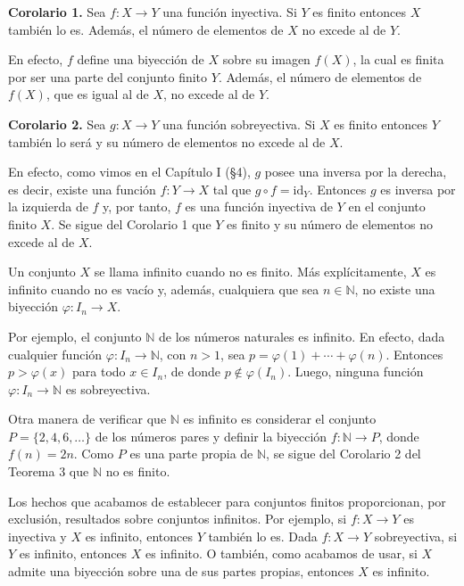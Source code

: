 \documentclass[12pt,oneside]{book}
\begin{document}
\textbf{Corolario 1.} Sea \( f: X \to Y \) una función inyectiva. Si \( Y \) es finito entonces \( X \) también lo es. Además, el número de elementos de \( X \) no excede al de \( Y \).

En efecto, \( f \) define una biyección de \( X \) sobre su imagen \( f(X) \), la cual es finita por ser una parte del conjunto finito \( Y \). Además, el número de elementos de \( f(X) \), que es igual al de \( X \), no excede al de \( Y \).

\textbf{Corolario 2.} Sea \( g: X \to Y \) una función sobreyectiva. Si \( X \) es finito entonces \( Y \) también lo será y su número de elementos no excede al de \( X \).

En efecto, como vimos en el Capítulo I (§4), \( g \) posee una inversa por la derecha, es decir, existe una función \( f: Y \to X \) tal que \( g \circ f = \text{id}_Y \). Entonces \( g \) es inversa por la izquierda de \( f \) y, por tanto, \( f \) es una función inyectiva de \( Y \) en el conjunto finito \( X \). Se sigue del Corolario 1 que \( Y \) es finito y su número de elementos no excede al de \( X \).

Un conjunto \( X \) se llama infinito cuando no es finito. Más explícitamente, \( X \) es infinito cuando no es vacío y, además, cualquiera que sea \( n \in \mathbb{N} \), no existe una biyección \( \varphi: I_n \to X \).

Por ejemplo, el conjunto \( \mathbb{N} \) de los números naturales es infinito. En efecto, dada cualquier función \( \varphi: I_n \to \mathbb{N} \), con \( n > 1 \), sea \( p = \varphi(1) + \cdots + \varphi(n) \). Entonces \( p > \varphi(x) \) para todo \( x \in I_n \), de donde \( p \notin \varphi(I_n) \). Luego, ninguna función \( \varphi: I_n \to \mathbb{N} \) es sobreyectiva.

Otra manera de verificar que \( \mathbb{N} \) es infinito es considerar el conjunto \( P = \{2, 4, 6, \dots\} \) de los números pares y definir la biyección \( f: \mathbb{N} \to P \), donde \( f(n) = 2n \). Como \( P \) es una parte propia de \( \mathbb{N} \), se sigue del Corolario 2 del Teorema 3 que \( \mathbb{N} \) no es finito.

Los hechos que acabamos de establecer para conjuntos finitos proporcionan, por exclusión, resultados sobre conjuntos infinitos. Por ejemplo, si \( f: X \to Y \) es inyectiva y \( X \) es infinito, entonces \( Y \) también lo es. Dada \( f: X \to Y \) sobreyectiva, si \( Y \) es infinito, entonces \( X \) es infinito. O también, como acabamos de usar, si \( X \) admite una biyección sobre una de sus partes propias, entonces \( X \) es infinito.
\end{document}
